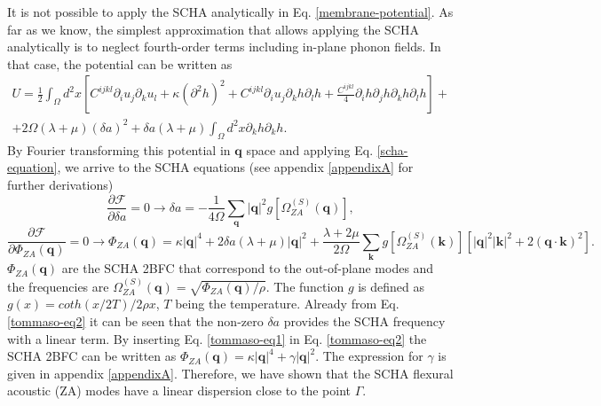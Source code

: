 It is not possible to apply the SCHA analytically in Eq. \ref{membrane-potential}. As far as we know, the simplest 
approximation that allows applying the SCHA analytically is to neglect fourth-order terms including in-plane phonon 
fields. In that case, the potential can be written as
\begin{multline}
\label{membrane-potential-tommaso}
U=\frac{1}{2}\int_{\Omega}d^{2}x[C^{ijkl}\partial_{i}u_{j}\partial_{k}u_{l}+\kappa(\partial^{2}h)^{2}+
C^{ijkl}\partial_{i}u_{j}\partial_{k}h\partial_{l}h+\frac{C^{ijkl}}{4}\partial_{i}h\partial_{j}h\partial_{k}h\partial_{l}h]+\\+2\Omega(\lambda+\mu)(\delta a)^{2}+\delta a(\lambda+\mu)\int_{\Omega}d^{2}x\partial_{k}h\partial_{k}h.
\end{multline}
By Fourier transforming this potential in $\boldsymbol{q}$ space and applying Eq. \ref{scha-equation}, we arrive to 
the SCHA equations (see appendix \ref{appendixA} for further derivations)
\begin{equation}
\label{tommaso-eq1}
\frac{\partial\mathcal{F}}{\partial\delta a}=0\rightarrow\delta a=-\frac{1}{4\Omega}\sum_{\boldsymbol{q}}|\boldsymbol{q}|^{2}g[\Omega_{ZA}^{(S)}(\boldsymbol{q})],
\end{equation}   
\begin{equation}
\label{tommaso-eq2}
\frac{\partial\mathcal{F}}{\partial\Phi_{ZA}(\boldsymbol{q})}=0\rightarrow\Phi_{ZA}(\boldsymbol{q})=\kappa|\boldsymbol{q}|^{4}+2\delta a(\lambda+\mu)|\boldsymbol{q}|^{2}+\frac{\lambda+2\mu}{2\Omega}\sum_{\boldsymbol{k}}g[\Omega_{ZA}^{(S)}(\boldsymbol{k})][|\boldsymbol{q}|^{2}|\boldsymbol{k}|^{2}+2(\boldsymbol{q}\cdot\boldsymbol{k})^{2}].
\end{equation}
$\Phi_{ZA}(\boldsymbol{q})$ are the SCHA 2BFC that correspond to the out-of-plane modes and the frequencies are 
$\Omega_{ZA}^{(S)}(\boldsymbol{q})=\sqrt{\Phi_{ZA}(\boldsymbol{q})/\rho}$. The function $g$ is defined as
$g(x)=coth(x/2T)/2\rho x$, $T$ being the temperature. Already from Eq. \ref{tommaso-eq2} it can be seen that the 
non-zero $\delta a$ provides the SCHA frequency with a linear term. By inserting Eq. \ref{tommaso-eq1} in 
Eq. \ref{tommaso-eq2} the SCHA 2BFC can be written as 
$\Phi_{ZA}(\boldsymbol{q})=\kappa|\boldsymbol{q}|^{4}+\gamma|\boldsymbol{q}|^{2}$. The expression for $\gamma$ is 
given in appendix \ref{appendixA}. Therefore, we have shown that the SCHA flexural acoustic (ZA) modes have a linear 
dispersion close to the point $\Gamma$. \\

